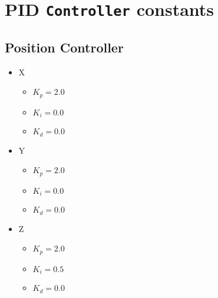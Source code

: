 \documentclass[10pt, a4paper]{article}
\newcommand{\textDef}[1]{\texttt{#1}}
\begin{document}
\section{PID \textDef{Controller} constants}
\label{pidconst}
    \begin{multicols}{2}
    \subsection{Position Controller}
        \begin{itemize}
            \item X
            \begin{itemize}
                \item $K_p = 2.0$
                \item $K_i = 0.0$
                \item $K_d = 0.0$
            \end{itemize}
            \item Y
            \begin{itemize}
                \item $K_p = 2.0$
                \item $K_i = 0.0$
                \item $K_d = 0.0$
            \end{itemize}
            \item Z
            \begin{itemize}
                \item $K_p = 2.0$
                \item $K_i = 0.5$
                \item $K_d = 0.0$
            \end{itemize}
        \end{itemize}
    \columnbreak
    

\end{multicols}
\end{document}
